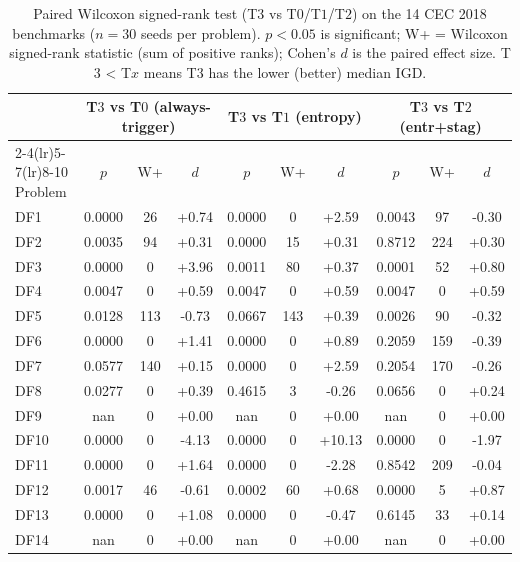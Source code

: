 \begin{table}[t]
\centering
\small
\caption{Paired Wilcoxon signed-rank test (T$3$ vs T$0$/T$1$/T$2$) on the 14 CEC 2018 benchmarks ($n=30$ seeds per problem). $p<0.05$ is significant; W+ = Wilcoxon signed-rank statistic (sum of positive ranks); Cohen's $d$ is the paired effect size. T$3$ < T$x$ means T$3$ has the lower (better) median IGD.}
\label{tab:wilcoxon-ablation}
\begin{tabular}{lccccccccc}
\toprule
 & \multicolumn{3}{c}{T$3$ vs T$0$ (always-trigger)} & \multicolumn{3}{c}{T$3$ vs T$1$ (entropy)} & \multicolumn{3}{c}{T$3$ vs T$2$ (entr+stag)} \\
\cmidrule(lr){2-4}\cmidrule(lr){5-7}\cmidrule(lr){8-10}
Problem & $p$ & W+ & $d$ & $p$ & W+ & $d$ & $p$ & W+ & $d$ \\
\midrule
DF1   & 0.0000 & 26 & +0.74 & 0.0000 & 0 & +2.59 & 0.0043 & 97 & -0.30 \\
DF2   & 0.0035 & 94 & +0.31 & 0.0000 & 15 & +0.31 & 0.8712 & 224 & +0.30 \\
DF3   & 0.0000 & 0 & +3.96 & 0.0011 & 80 & +0.37 & 0.0001 & 52 & +0.80 \\
DF4   & 0.0047 & 0 & +0.59 & 0.0047 & 0 & +0.59 & 0.0047 & 0 & +0.59 \\
DF5   & 0.0128 & 113 & -0.73 & 0.0667 & 143 & +0.39 & 0.0026 & 90 & -0.32 \\
DF6   & 0.0000 & 0 & +1.41 & 0.0000 & 0 & +0.89 & 0.2059 & 159 & -0.39 \\
DF7   & 0.0577 & 140 & +0.15 & 0.0000 & 0 & +2.59 & 0.2054 & 170 & -0.26 \\
DF8   & 0.0277 & 0 & +0.39 & 0.4615 & 3 & -0.26 & 0.0656 & 0 & +0.24 \\
DF9   & nan & 0 & +0.00 & nan & 0 & +0.00 & nan & 0 & +0.00 \\
DF10  & 0.0000 & 0 & -4.13 & 0.0000 & 0 & +10.13 & 0.0000 & 0 & -1.97 \\
DF11  & 0.0000 & 0 & +1.64 & 0.0000 & 0 & -2.28 & 0.8542 & 209 & -0.04 \\
DF12  & 0.0017 & 46 & -0.61 & 0.0002 & 60 & +0.68 & 0.0000 & 5 & +0.87 \\
DF13  & 0.0000 & 0 & +1.08 & 0.0000 & 0 & -0.47 & 0.6145 & 33 & +0.14 \\
DF14  & nan & 0 & +0.00 & nan & 0 & +0.00 & nan & 0 & +0.00 \\
\midrule
\bottomrule
\end{tabular}
\end{table}
